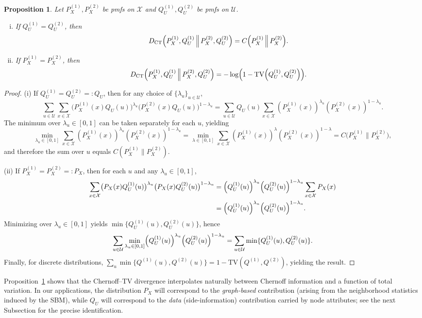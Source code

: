 \documentclass[11pt]{article}
\theoremstyle{plain}
\newtheorem{proposition}[theorem]{Proposition}
\theoremstyle{definition}
\begin{document}
\begin{proposition}\label{prop:CT_special_cases}
Let $P_X^{(1)},P_X^{(2)}$ be pmfs on $\mathcal{X}$ and $Q_U^{(1)},Q_U^{(2)}$ be pmfs on $\mathcal{U}$.

\begin{enumerate}[(i)]
\item If $Q_U^{(1)}=Q_U^{(2)}$, then
\[
D_{\mathrm{CT}}\Bigl(P_X^{(1)},Q_U^{(1)} \,\Big\|\, P_X^{(2)},Q_U^{(2)}\Bigr)
= C\Bigl(P_X^{(1)} \,\Big\|\, P_X^{(2)}\Bigr).
\]

\item If $P_X^{(1)}=P_X^{(2)}$, then
\[
D_{\mathrm{CT}}\Bigl(P_X^{(1)},Q_U^{(1)} \,\Big\|\, P_X^{(2)},Q_U^{(2)}\Bigr)
= -\log \Bigl(1-\mathrm{TV}\Bigl(Q_U^{(1)},Q_U^{(2)}\Bigr)\Bigr).
\]
\end{enumerate}
\end{proposition}
\begin{proof}
(i) If $Q_U^{(1)}=Q_U^{(2)}=:Q_U$, then for any choice of $\{\lambda_u\}_{u\in\mathcal{U}}$,
\[
\sum_{u\in\mathcal{U}}\sum_{x\in\mathcal{X}}
\bigl(P_X^{(1)}(x)Q_U(u)\bigr)^{\lambda_u}
\bigl(P_X^{(2)}(x)Q_U(u)\bigr)^{1-\lambda_u}
=
\sum_{u\in\mathcal{U}} Q_U(u)\sum_{x\in\mathcal{X}} (P_X^{(1)}(x))^{\lambda_u}(P_X^{(2)}(x))^{1-\lambda_u}.
\]
The minimum over $\lambda_u\in[0,1]$ can be taken separately for each $u$, yielding
\[
\min_{\lambda_u\in[0,1]}\sum_{x\in\mathcal{X}} (P_X^{(1)}(x))^{\lambda_u}(P_X^{(2)}(x))^{1-\lambda_u}
=\min_{\lambda\in[0,1]}\sum_{x\in\mathcal{X}} (P_X^{(1)}(x))^{\lambda}(P_X^{(2)}(x))^{1-\lambda}
= C\bigl(P_X^{(1)}\|P_X^{(2)}\bigr),
\]
and therefore the sum over $u$ equals $C(P_X^{(1)}\|P_X^{(2)})$.

(ii) If $P_X^{(1)}=P_X^{(2)}=:P_X$, then for each $u$ and any $\lambda_u\in[0,1]$,
\begin{align*}
	\sum_{x\in\mathcal{X}}
\bigl(P_X(x)Q_U^{(1)}(u)\bigr)^{\lambda_u}
\bigl(P_X(x)Q_U^{(2)}(u)\bigr)^{1-\lambda_u}
&=
\Bigl(Q_U^{(1)}(u)\Bigr)^{\lambda_u}\Bigl(Q_U^{(2)}(u)\Bigr)^{1-\lambda_u}\sum_{x\in\mathcal{X}} P_X(x)\\
&=
\Bigl(Q_U^{(1)}(u)\Bigr)^{\lambda_u}\Bigl(Q_U^{(2)}(u)\Bigr)^{1-\lambda_u}.
\end{align*}
Minimizing over $\lambda_u\in[0,1]$ yields $\min\{Q_U^{(1)}(u),Q_U^{(2)}(u)\}$, hence
\[
\sum_{u\in\mathcal{U}} \min_{\lambda_u\in[0,1]}
\Bigl(Q_U^{(1)}(u)\Bigr)^{\lambda_u}\Bigl(Q_U^{(2)}(u)\Bigr)^{1-\lambda_u}
=
\sum_{u\in\mathcal{U}} \min\{Q_U^{(1)}(u),Q_U^{(2)}(u)\}.
\]
Finally, for discrete distributions,
$\sum_{u}\min\{Q^{(1)}(u),Q^{(2)}(u)\}=1-\mathrm{TV}(Q^{(1)},Q^{(2)})$, yielding the result.
\end{proof}
Proposition~\ref{prop:CT_special_cases} shows that the Chernoff--TV divergence interpolates naturally between Chernoff information and a function of total variation. In our applications, the distribution $P_X$ will correspond to the \emph{graph-based} contribution (arising from the neighborhood statistics induced by the SBM), while $Q_U$ will correspond to the \emph{data} (side-information) contribution carried by node attributes; see the next Subsection for the precise identification.
\end{document}
